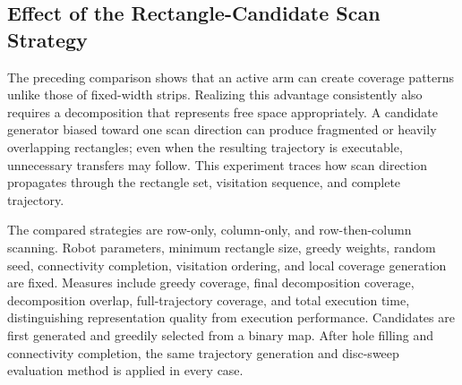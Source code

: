 \documentclass[a4paper,11pt]{article}
\providecommand{\DIFdelend}{} %
\begin{document}
\DIFdelend \subsection{Effect of the Rectangle-Candidate Scan Strategy}

The preceding comparison shows that an active arm can create coverage patterns unlike those of fixed-width strips. Realizing this advantage consistently also requires a decomposition that represents free space appropriately. A candidate generator biased toward one scan direction can produce fragmented or heavily overlapping rectangles; even when the resulting trajectory is executable, unnecessary transfers may follow. This experiment traces how scan direction propagates through the rectangle set, visitation sequence, and complete trajectory.

The compared strategies are row-only, column-only, and row-then-column scanning. Robot parameters, minimum rectangle size, greedy weights, random seed, connectivity completion, visitation ordering, and local coverage generation are fixed. Measures include greedy coverage, final decomposition coverage, decomposition overlap, full-trajectory coverage, and total execution time, distinguishing representation quality from execution performance. Candidates are first generated and greedily selected from a binary map. After hole filling and connectivity completion, the same trajectory generation and disc-sweep evaluation method is applied in every case.
\end{document}
